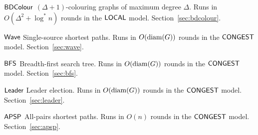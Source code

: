 {\begin{algorithms}
    \item[$\textup{\sffamily BDColour}$] $(\Delta+1)$-colouring graphs of maximum degree $\Delta$. Runs in $O(\Delta^2 + \log^* n)$ rounds in the $\textup{\sffamily LOCAL}$ model. Section~\ref{sec:bdcolour}.
    \item[$\textup{\sffamily Wave}$] Single-source shortest paths. Runs in $O(\operatorname{diam}(G))$ rounds in the $\textup{\sffamily CONGEST}$ model. Section~\ref{sec:wave}.
    \item[$\textup{\sffamily BFS}$] Breadth-first search tree. Runs in $O(\operatorname{diam}(G))$ rounds in the $\textup{\sffamily CONGEST}$ model. Section~\ref{sec:bfs}.
    \item[$\textup{\sffamily Leader}$] Leader election. Runs in $O(\operatorname{diam}(G))$ rounds in the $\textup{\sffamily CONGEST}$ model. Section~\ref{sec:leader}.
    \item[$\textup{\sffamily APSP}$] All-pairs shortest paths. Runs in $O(n)$ rounds in the $\textup{\sffamily CONGEST}$ model. Section~\ref{sec:apsp}.
\end{algorithms}}
